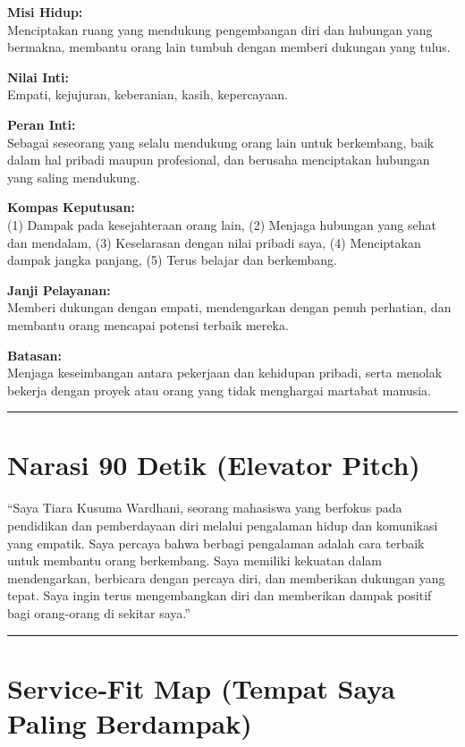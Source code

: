 \documentclass[
  letterpaper,
  DIV=11,
  numbers=noendperiod]{scrreprt}
\begin{document}
\textbf{Misi Hidup:}\\
Menciptakan ruang yang mendukung pengembangan diri dan hubungan yang
bermakna, membantu orang lain tumbuh dengan memberi dukungan yang tulus.

\textbf{Nilai Inti:}\\
Empati, kejujuran, keberanian, kasih, kepercayaan.

\textbf{Peran Inti:}\\
Sebagai seseorang yang selalu mendukung orang lain untuk berkembang,
baik dalam hal pribadi maupun profesional, dan berusaha menciptakan
hubungan yang saling mendukung.

\textbf{Kompas Keputusan:}\\
(1) Dampak pada kesejahteraan orang lain, (2) Menjaga hubungan yang
sehat dan mendalam, (3) Keselarasan dengan nilai pribadi saya, (4)
Menciptakan dampak jangka panjang, (5) Terus belajar dan berkembang.

\textbf{Janji Pelayanan:}\\
Memberi dukungan dengan empati, mendengarkan dengan penuh perhatian, dan
membantu orang mencapai potensi terbaik mereka.

\textbf{Batasan:}\\
Menjaga keseimbangan antara pekerjaan dan kehidupan pribadi, serta
menolak bekerja dengan proyek atau orang yang tidak menghargai martabat
manusia.

\begin{center}\rule{0.5\linewidth}{0.5pt}\end{center}

\section{Narasi 90 Detik (Elevator
Pitch)}\label{narasi-90-detik-elevator-pitch}

``Saya Tiara Kusuma Wardhani, seorang mahasiswa yang berfokus pada
pendidikan dan pemberdayaan diri melalui pengalaman hidup dan komunikasi
yang empatik. Saya percaya bahwa berbagi pengalaman adalah cara terbaik
untuk membantu orang berkembang. Saya memiliki kekuatan dalam
mendengarkan, berbicara dengan percaya diri, dan memberikan dukungan
yang tepat. Saya ingin terus mengembangkan diri dan memberikan dampak
positif bagi orang-orang di sekitar saya.''

\begin{center}\rule{0.5\linewidth}{0.5pt}\end{center}

\section{Service‑Fit Map (Tempat Saya Paling
Berdampak)}\label{servicefit-map-tempat-saya-paling-berdampak}
\end{document}
